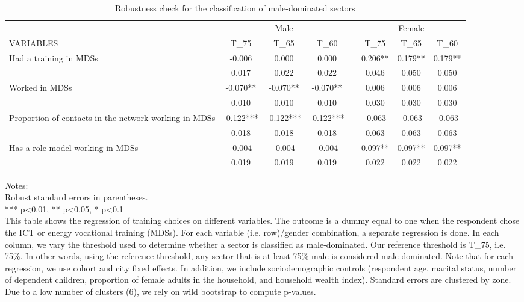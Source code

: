 \begin{landscape}
\begin{table}[]
\caption{Robustness check for the classification of male-dominated sectors}
\label{tab:MDS_reg_robustness}
\begin{tabular}{@{}lccccccc@{}}
\toprule
& \multicolumn{3}{c}{Male}        &  & \multicolumn{3}{c}{Female}     \\ \cmidrule(lr){2-4}  \cmidrule(l){6-8}
VARIABLES  & T\_75    & T\_65     & T\_60    &  & T\_75    & T\_65    & T\_60    \\ \midrule
Had a training in MDSs&   -0.006&    0.000&    0.000&&    0.206**&    0.179**&    0.179**\\
&    0.017&    0.022&    0.022&&    0.046&    0.050&    0.050\\
Worked in MDSs&   -0.070**&   -0.070**&   -0.070**&&    0.006&    0.006&    0.006\\
&    0.010&    0.010&    0.010&&    0.030&    0.030&    0.030\\
Proportion of contacts in the network working in MDSs&   -0.122***&   -0.122***&   -0.122***&&   -0.063&   -0.063&   -0.063\\
&    0.018&    0.018&    0.018&&    0.063&    0.063&    0.063\\
Has a role model working in MDSs&   -0.004&   -0.004&   -0.004&&    0.097**&    0.097**&    0.097**\\
&    0.019&    0.019&    0.019&&    0.022&    0.022&    0.022\\
\midrule
\end{tabular}
\begin{minipage}{21cm}
\small{
{\textit Notes:} \\
Robust standard errors in parentheses. \\
*** p\textless{}0.01, ** p\textless{}0.05, * p\textless{}0.1 \\
This table shows the regression of training choices on different variables. The outcome is a dummy equal to one when the respondent chose the ICT or energy vocational training (MDSs). For each variable (i.e. row)/gender combination, a separate regression is done. In each column, we vary the threshold used to determine whether a sector is classified as male-dominated.  Our reference threshold is T\_75, i.e. 75\%. In other words, using the reference threshold, any sector that is at least 75\% male is considered male-dominated. Note that for each regression, we use cohort and city fixed effects. In addition, we include sociodemographic controls (respondent age, marital status, number of dependent children, proportion of female adults in the household, and household wealth index). Standard errors are clustered by zone. Due to a low number of clusters (6), we rely on wild bootstrap to compute p-values.
}
\end{minipage}
\end{table}
\end{landscape}
